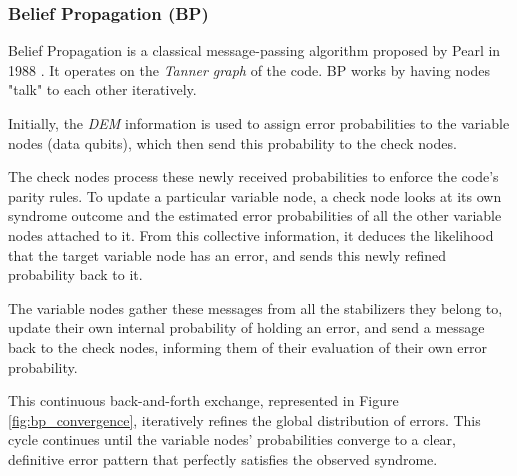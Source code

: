 \subsubsection*{Belief Propagation (BP)}

Belief Propagation is a classical message-passing algorithm proposed by Pearl in 1988 \cite{Pearl_88}. It operates on the \textit{Tanner graph} of the code. BP works by having nodes "talk" to each other iteratively. 

Initially, the \textit{DEM} information is used to assign error probabilities to the variable nodes (data qubits), which then send this probability to the check nodes. 

The check nodes process these newly received probabilities to enforce the code's parity rules. To update a particular variable node, a check node looks at its own syndrome outcome and the estimated error probabilities of all the other variable nodes attached to it. From this collective information, it deduces the likelihood that the target variable node has an error, and sends this newly refined probability back to it. 

The variable nodes gather these messages from all the stabilizers they belong to, update their own internal probability of holding an error, and send a message back to the check nodes, informing them of their evaluation of their own error probability.

This continuous back-and-forth exchange, represented in Figure \ref{fig:bp_convergence}, iteratively refines the global distribution of errors. This cycle continues until the variable nodes' probabilities converge to a clear, definitive error pattern that perfectly satisfies the observed syndrome. 

